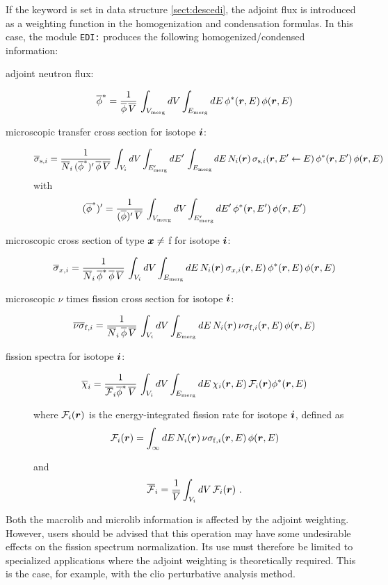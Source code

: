 If the  keyword is set in data structure \ref{sect:descedi}, the adjoint flux is introduced as a weighting function in the
homogenization and condensation formulas. In this case, the module {\tt EDI:} produces the following homogenized/condensed information:

\begin{description}

\item[adjoint neutron flux:]
$$
\overline\phi^* = {1\over \overline\phi\, \overline V} \, \int_{V_{\rm merg}} dV \int_{E_{\rm merg}} dE \, \phi^*(\bff(r),E)\, \phi(\bff(r),E)
$$

\item[microscopic transfer cross section for isotope $\bff(i)$:]
$$
\overline \sigma_{{\rm s},i} ={ 1 \over \overline N_i\, (\overline\phi^*)' \, \overline\phi \, \overline V} \, \int_{V_i} dV \int_{E'_{\rm merg}} dE' \,\int_{E_{\rm merg}} dE \, N_i(\bff(r)) \, \sigma_{{\rm s},i}(\bff(r),E' \leftarrow E) \, \phi^*(\bff(r),E') \, \phi(\bff(r),E)
$$
\noindent with
$$
(\overline\phi^*)' = {1\over (\overline\phi)' \, \overline V} \, \int_{V_{\rm merg}} dV \int_{E'_{\rm merg}} dE' \, \phi^*(\bff(r),E')\, \phi(\bff(r),E')
$$

\item[microscopic cross section of type $\bff(x)\neq$ f for isotope $\bff(i)$:]
$$
\overline \sigma_{x,i} ={ 1 \over \overline N_i\, \overline\phi^* \, \overline\phi \, \overline V} \, \int_{V_i} dV \int_{E_{\rm merg}} dE \, N_i(\bff(r)) \, \sigma_{x,i}(\bff(r),E) \, \phi^*(\bff(r),E) \, \phi(\bff(r),E)
$$

\item[microscopic $\nu$ times fission cross section for isotope $\bff(i)$:]
$$
\overline\nu\overline\sigma_{{\rm f},i} ={ 1 \over \overline N_i\, \overline\phi \, \overline V} \, \int_{V_i} dV \int_{E_{\rm merg}} dE \, N_i(\bff(r)) \, \nu\sigma_{{\rm f},i}(\bff(r),E) \, \phi(\bff(r),E)
$$

\item[fission spectra for isotope $\bff(i)$:]
$$
\overline\chi_{i} ={ 1 \over \overline{\cal F}_i \overline\phi^* \, \overline V} \, \int_{V_i} dV \int_{E_{\rm merg}} dE \, \chi_{i}(\bff(r),E) \, {\cal F}_i(\bff(r)) \phi^*(\bff(r),E)
$$

\noindent where ${\cal F}_i(\bff(r))$ is the energy-integrated fission rate for isotope $\bff(i)$, defined as
$$
{\cal F}_i(\bff(r))=\int_\infty dE \, N_i(\bff(r)) \, \nu\sigma_{{\rm f},i}(\bff(r),E) \, \phi(\bff(r),E)
$$

\noindent and
$$
\overline{\cal F}_i={1\over \overline V} \int_{V_i} dV \, {\cal F}_i(\bff(r)) \ .
$$
\end{description}

Both the macrolib and microlib information is affected by the adjoint weighting. However, users should be advised that this operation may have some
undesirable effects on the fission spectrum normalization. Its use must therefore be limited to specialized applications where the adjoint weighting
is theoretically required. This is the case, for example, with the {\sc clio} perturbative analysis method.\cite{clio}

\eject
